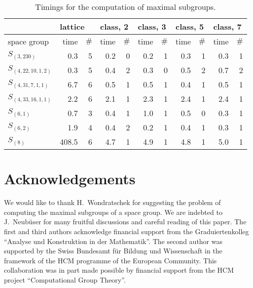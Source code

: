 \documentclass[12pt]{amsart}
\begin{document}
\begin{table}[h]
\begin{center}
\begin{tabular}{|l|| r| r| r| r| r| r| r| r| r| r|}
\hline
      & \multicolumn{2}{l|}{lattice} 
      & \multicolumn{2}{l|}{class, 2} 
      & \multicolumn{2}{l|}{class, 3} 
      & \multicolumn{2}{l|}{class, 5} 
      & \multicolumn{2}{l|}{class, 7}  \\
\hline
      space group
      & time & $\#$ & time & $\#$ & time & $\#$ & time & $\#$ 
      & time & $\#$ \\
\hline
$S_{(3,230)}$       & 0.3 & 5 &  0.2 & 0 &  0.2 & 1 &  0.3 & 1 &  0.3 & 1 \\
$S_{(4,22,10,1,2)}$ & 0.3 & 5 &  0.4 & 2 &  0.3 & 0 &  0.5 & 2 &  0.7 & 2 \\
$S_{(4,31, 7,1,1)}$ & 6.7 & 6 &  0.5 & 1 &  0.5 & 1 &  0.4 & 1 &  0.5 & 1 \\
$S_{(4,33,16,1,1)}$ & 2.2 & 6 &  2.1 & 1 &  2.3 & 1 &  2.4 & 1 &  2.4 & 1 \\
$S_{(6,1)}$         & 0.7 & 3 &  0.4 & 1 &  1.0 & 1 &  0.5 & 0 &  0.3 & 1 \\
$S_{(6,2)}$       &   1.9 & 4 &  0.4 & 2 &  0.2 & 1 &  0.4 & 1 &  0.3 & 1 \\
$S_{(8)}$         & 408.5 & 6 &  4.7 & 1 &  4.9 & 1 &  4.8 & 1 &  5.0 & 1 \\
\hline
\end{tabular}
\end{center}
\bigskip
\caption{Timings for the computation of maximal subgroups.}
\end{table}


\section{Acknowledgements}
We would like to thank H.~Wondratschek for suggesting the problem of
computing the maximal subgroups of a space group.  We are indebted to
J.~Neub\"user for many fruitful discussions and careful reading of this
paper.  The first and third authors acknowledge financial support from
the Graduiertenkolleg ``Analyse und Konstruktion in der Mathematik''.
The second author was supported by the Swiss Bundesamt f\"ur Bildung
und Wissenschaft in the framework of the HCM programme of the 
European Community.
This collaboration was in part made possible by financial support from
the HCM project ``Computational Group Theory''.
\end{document}

